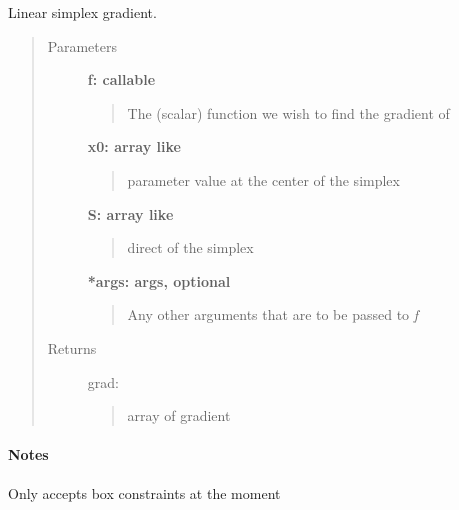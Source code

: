 \documentclass[letterpaper,10pt,english]{sphinxmanual}
\begin{document}
\begin{fulllineitems}
Linear simplex gradient.
\begin{quote}\begin{description}
\item[{Parameters}] \leavevmode
\textbf{f: callable}
\begin{quote}

The (scalar) function we wish to find the gradient of
\end{quote}

\textbf{x0: array like}
\begin{quote}

parameter value at the center of the simplex
\end{quote}

\textbf{S: array like}
\begin{quote}

direct of the simplex
\end{quote}

\textbf{*args: args, optional}
\begin{quote}

Any other arguments that are to be passed to \emph{f}
\end{quote}

\item[{Returns}] \leavevmode
grad: \href{http://docs.scipy.org/doc/numpy/reference/generated/numpy.ndarray.html\#numpy.ndarray}{}
\begin{quote}

array of gradient
\end{quote}

\end{description}\end{quote}
\paragraph{Notes}

Only accepts box constraints at the moment

\end{fulllineitems}
\end{document}
